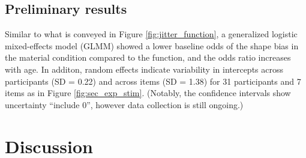 \documentclass[10pt, letterpaper]{article}
\begin{document}
\hypertarget{preliminary-results}{%
\subsection{Preliminary results}\label{preliminary-results}}

Similar to what is conveyed in Figure \ref{fig:jitter_function}, a
generalized logistic mixed-effects model (GLMM) showed a lower baseline
odds of the shape bias in the material condition compared to the
function, and the odds ratio increases with age. In additon, random
effects indicate variability in intercepts across participants (SD =
0.22) and across items (SD = 1.38) for 31 participants and 7 items as in
Figure \ref{fig:sec_exp_stim}. (Notably, the confidence intervals show
uncertainty ``include 0'', however data collection is still ongoing.)

\hypertarget{discussion-1}{%
\section{Discussion}\label{discussion-1}}
\end{document}
